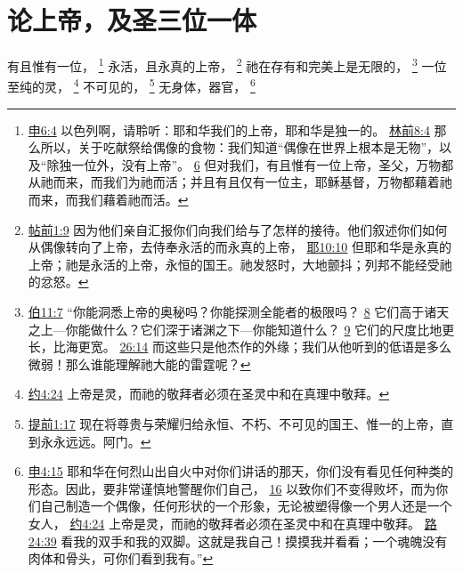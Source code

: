 \documentclass[12pt, a4paper, oneside]{ctexart}
\newcounter{parnum}[section]
\newcommand{\N}{%
   \noindent\refstepcounter{parnum}%
    \makebox[\parindent][l]{\textbf{\arabic{parnum}.}}}
\begin{document}
\section{论上帝，及圣三位一体}

\N 有且惟有一位，
	\footnote {
		\href{https://biblehub.com/deuteronomy/6-4.htm}{申6:4} 以色列啊，请聆听：耶和华我们的上帝，耶和华是独一的。
		\href{https://biblehub.com/1_corinthians/8-4.htm}{林前8:4} 那么所以，关于吃献祭给偶像的食物：我们知道“偶像在世界上根本是无物”，以及“除独一位外，没有上帝”。
		\href{https://biblehub.com/1_corinthians/8-6.htm}{6} 但对我们，有且惟有一位上帝，圣父，万物都从祂而来，而我们为祂而活；并且有且仅有一位主，耶稣基督，万物都藉着祂而来，而我们藉着祂而活。
	}
	永活，且永真的上帝，
	\footnote {
		\href{https://biblehub.com/1_thessalonians/1-9.htm}{帖前1:9} 因为他们亲自汇报你们向我们给与了怎样的接待。他们叙述你们如何从偶像转向了上帝，去侍奉永活的而永真的上帝，
		\href{https://biblehub.com/jeremiah/10-10.htm}{耶10:10} 但耶和华是永真的上帝；祂是永活的上帝，永恒的国王。祂发怒时，大地颤抖；列邦不能经受祂的忿怒。	
	}
	祂在存有和完美上是无限的，
	\footnote {
		\href{https://biblehub.com/job/11-7.htm}{伯11:7} “你能洞悉上帝的奥秘吗？你能探测全能者的极限吗？
		\href{https://biblehub.com/job/11-8.htm}{8} 它们高于诸天之上---你能做什么？它们深于诸渊之下---你能知道什么？
		\href{https://biblehub.com/job/11-9.htm}{9} 它们的尺度比地更长，比海更宽。
		\href{https://biblehub.com/job/26-14.htm}{26:14} 而这些只是他杰作的外缘；我们从他听到的低语是多么微弱！那么谁能理解祂大能的雷霆呢？
	}
	一位至纯的灵，
	\footnote {
		\href{https://biblehub.com/john/4-24.htm}{约4:24} 上帝是灵，而祂的敬拜者必须在圣灵中和在真理中敬拜。
	}
	不可见的，
	\footnote {
		\href{https://biblehub.com/1_timothy/1-17.htm}{提前1:17} 现在将尊贵与荣耀归给永恒、不朽、不可见的国王、惟一的上帝，直到永永远远。阿门。
	}
	无身体，器官，
	\footnote {
		\href{https://biblehub.com/deuteronomy/4-15.htm}{申4:15} 耶和华在何烈山出自火中对你们讲话的那天，你们没有看见任何种类的形态。因此，要非常谨慎地警醒你们自己，
		\href{https://biblehub.com/deuteronomy/4-16.htm}{16} 以致你们不变得败坏，而为你们自己制造一个偶像，任何形状的一个形象，无论被塑得像一个男人还是一个女人，
		\href{https://biblehub.com/john/4-24.htm}{约4:24} 上帝是灵，而祂的敬拜者必须在圣灵中和在真理中敬拜。
		\href{https://biblehub.com/luke/24-39.htm}{路24:39} 看我的双手和我的双脚。这就是我自己！摸摸我并看看；一个魂魄没有肉体和骨头，可你们看到我有。”
	}
\end{document}
